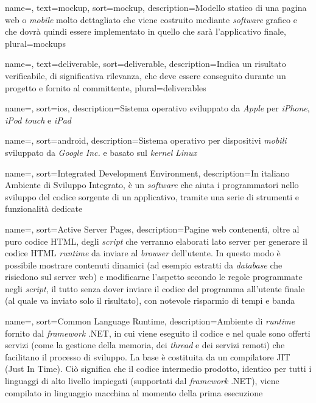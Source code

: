 {
    name=,
    text=mockup,
    sort=mockup,
    description={Modello statico di una pagina web o \textit{mobile} molto dettagliato che viene costruito mediante \textit{software} grafico e che dovrà quindi essere implementato in quello che sarà l'applicativo finale},
    plural=mockups
}

{
    name=,
    text=deliverable,
    sort=deliverable,
    description={Indica un risultato verificabile, di significativa rilevanza, che deve essere conseguito durante un progetto e fornito al committente},
    plural=deliverables
}

{
    name=,
    sort=ios,
    description={Sistema operativo sviluppato da \textit{Apple} per \textit{iPhone}, \textit{iPod touch} e \textit{iPad}}
}

{
    name=,
    sort=android,
    description={Sistema operativo per dispositivi \textit{mobili} sviluppato da \textit{Google Inc.} e basato sul \textit{kernel} \textit{Linux}}
}

{
    name=,
    sort=Integrated Development Environment,
    description={In italiano Ambiente di Sviluppo Integrato, è un \textit{software} che aiuta i programmatori nello sviluppo del codice sorgente di un applicativo, tramite una serie di strumenti e funzionalità dedicate}
}

{
    name=,
    sort=Active Server Pages,
    description={Pagine web contenenti, oltre al puro codice HTML, degli \textit{script} che verranno elaborati lato server per generare il codice HTML \textit{runtime} da inviare al \textit{browser} dell'utente. In questo modo è possibile mostrare contenuti dinamici (ad esempio estratti da \textit{database} che risiedono sul server web) e modificarne l'aspetto secondo le regole programmate negli \textit{script}, il tutto senza dover inviare il codice del programma all'utente finale (al quale va inviato solo il risultato), con notevole risparmio di tempi e banda}
}

{
    name=,
    sort=Common Language Runtime,
    description={Ambiente di \textit{runtime} fornito dal \textit{framework} .NET, in cui viene eseguito il codice  e nel quale sono offerti servizi (come la gestione della memoria, dei \textit{thread} e dei servizi remoti) che facilitano il processo di sviluppo. La base è costituita da un compilatore JIT (Just In Time). Ciò significa che il codice intermedio prodotto, identico per tutti i linguaggi di alto livello impiegati (supportati dal \textit{framework} .NET), viene compilato in linguaggio macchina al momento della prima esecuzione}
}

